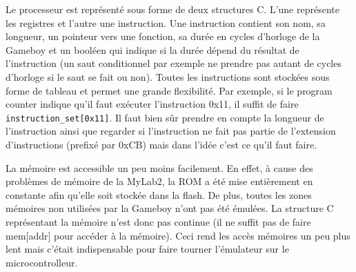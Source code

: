 \documentclass[a4paper]{article}
\begin{document}
Le processeur est représenté sous forme de deux structures C. L'une représente
les registres et l'autre une instruction. Une instruction contient son nom, 
sa longueur, un pointeur vers une fonction, sa durée en cycles d'horloge de la Gameboy
et un booléen qui indique si la durée dépend du résultat de l'instruction (un saut
conditionnel par exemple ne prendre pas autant de cycles d'horloge si le saut se fait
ou non). Toutes les instructions sont stockées sous forme de tableau et permet
une grande flexibilité. Par exemple, si le program counter indique qu'il faut exécuter
l'instruction 0x11, il suffit de faire \texttt{instruction_set[0x11]}. Il
faut bien sûr prendre en compte la longueur de l'instruction ainsi que regarder
si l'instruction ne fait pas partie de l'extension d'instructions (prefixé par 0xCB)
mais dans l'idée c'est ce qu'il faut faire.

\newpage

La mémoire est accessible un peu moins facilement. En effet, à cause des problèmes 
de mémoire de la MyLab2, la ROM a été mise entièrement en constante afin qu'elle 
soit stockée dans la flash. De plus, toutes les zones mémoires non utilisées par 
la Gameboy n'ont pas été émulées. La structure C représentant la mémoire n'est 
donc pas continue (il ne suffit pas de faire mem[addr] pour accéder à la mémoire).
Ceci rend les accès mémoires un peu plus lent mais c'était indispensable pour faire
tourner l'émulateur sur le microcontrolleur. \\
\end{document}
